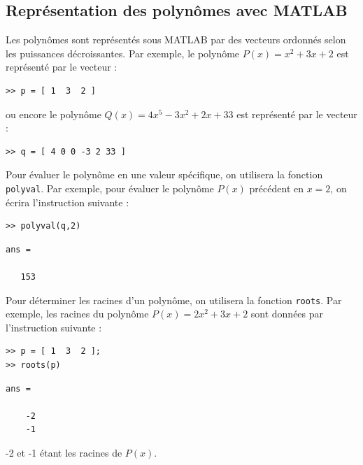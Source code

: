 \subsection{Représentation des polynômes avec MATLAB}
Les polynômes sont représentés sous MATLAB par des vecteurs ordonnés selon 
les puissances décroissantes.
Par exemple, le polynôme $P(x)=x^2+3x+2$ est représenté par le vecteur :
\begin{verbatim}
>> p = [ 1  3  2 ]
\end{verbatim}
ou encore le polynôme $Q(x)=4x^5−3x^2+2x+33$ est représenté par le vecteur :
\begin{verbatim}
>> q = [ 4 0 0 -3 2 33 ]
\end{verbatim}
Pour évaluer le polynôme en une valeur spécifique, on utilisera la fonction 
\texttt{polyval}. Par exemple, pour évaluer le polynôme $P(x)$ précédent 
en $x=2$, on écrira l'instruction suivante :
\begin{verbatim}
>> polyval(q,2)
\end{verbatim}
\begin{verbatim}
ans =

   153
\end{verbatim}
Pour déterminer les racines d'un polynôme, on utilisera la fonction 
\texttt{roots}. Par exemple, les racines du polynôme $P(x)=2x^2+3x+2$ sont 
données par l'instruction suivante :
\begin{verbatim}
>> p = [ 1  3  2 ];
>> roots(p)
\end{verbatim}
\begin{verbatim}
ans =

    -2
    -1
\end{verbatim}
-2 et -1 étant les racines de $P(x)$.

